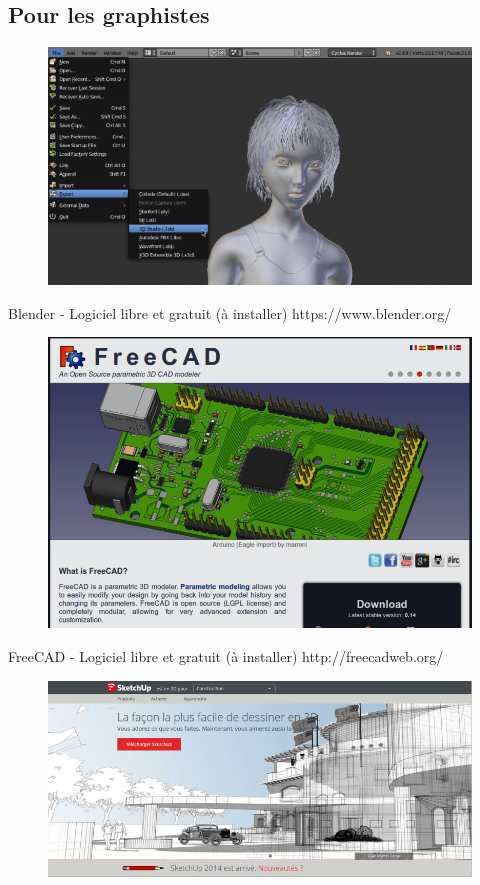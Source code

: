 \documentclass{article}
\begin{document}
\subsection{Pour les graphistes}
\begin{figure}[h!]
\centering
\includegraphics[scale=0.35]{./images/blender.png}
\end{figure}\hfill 
Blender - Logiciel libre et gratuit (à installer)
https://www.blender.org/
 \par\leavevmode\par
\begin{figure}[h!]
\centering
\includegraphics[scale=0.3]{./images/freecad.png}
\end{figure}\hfill 
FreeCAD - Logiciel libre et gratuit (à installer)
http://freecadweb.org/
\newpage
\begin{figure}[h!]
\centering
\includegraphics[scale=0.3]{./images/sketchup.png}
\end{figure}\hfill
\end{document}

